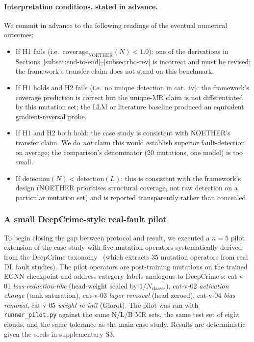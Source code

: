 \documentclass[acmsmall,screen,review]{acmart}
\begin{document}
\paragraph{Interpretation conditions, stated in advance.}
We commit in advance to the following readings of the eventual numerical outcomes:
\begin{itemize}
    \item If H1 fails (i.e.\ $\mathrm{coverage}_{\mathrm{NOETHER}}(N) < 1.0$): one of the derivations in Sections~\ref{subsec:end-to-end}--\ref{subsec:rho-rev} is incorrect and must be revised; the framework's transfer claim does not stand on this benchmark.
    \item If H1 holds and H2 fails (i.e.\ no unique detection in cat.~iv): the framework's coverage prediction is correct but the unique-MR claim is not differentiated by this mutation set; the LLM or literature baseline produced an equivalent gradient-reversal probe.
    \item If H1 and H2 both hold: the case study is consistent with NOETHER's transfer claim. We do \emph{not} claim this would establish superior fault-detection on average; the comparison's denominator (20 mutations, one model) is too small.
    \item If $\mathrm{detection}(N) < \mathrm{detection}(L)$: this is consistent with the framework's design (NOETHER prioritises structural coverage, not raw detection on a particular mutation set) and is reported transparently rather than concealed.
\end{itemize}

\subsubsection{A small DeepCrime-style real-fault pilot}
\label{subsec:deepcrime-pilot}

To begin closing the gap between protocol and result, we executed a $n=5$ pilot extension of the case study with five mutation operators systematically derived from the DeepCrime taxonomy~\cite{Humbatova2021DeepCrime} (which extracts 35 mutation operators from real DL fault studies). The pilot operators are post-training mutations on the trained EGNN checkpoint and address category labels analogous to DeepCrime's: cat-v-01 \emph{loss-reduction-like} (head-weight scaled by $1/N_{\text{classes}}$), cat-v-02 \emph{activation change} (tanh saturation), cat-v-03 \emph{layer removal} (head zeroed), cat-v-04 \emph{bias removal}, cat-v-05 \emph{weight re-init} (Glorot). The pilot was run with \texttt{runner\_pilot.py} against the same N/L/B MR sets, the same test set of eight clouds, and the same tolerance as the main case study. Results are deterministic given the seeds in supplementary S3.
\end{document}
